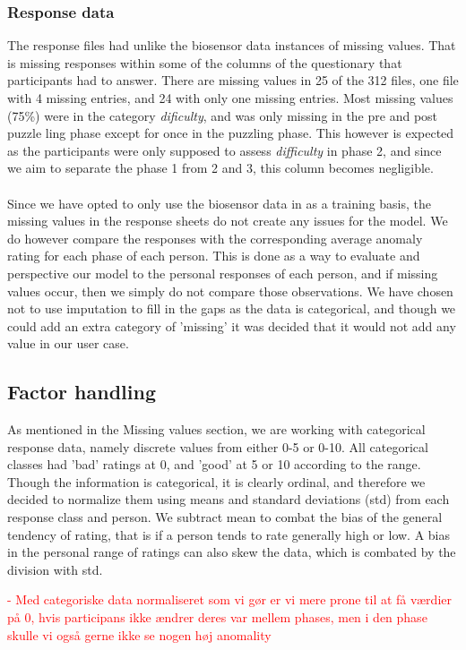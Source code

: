 \documentclass{article}
\begin{document}
\subsubsection*{Response data}
The response files had unlike the biosensor data instances of missing values. That is missing responses within some of the columns of the questionary that participants had to answer. There are missing values in 25 of the 312 files, one file with 4 missing entries, and 24 with only one missing entries. Most missing values (75\%) were in the category \textit{dificulty}, and was only missing in the pre and post puzzle ling phase except for once in the puzzling phase. This however is expected as the participants were only supposed to assess \textit{difficulty} in phase 2, and since we aim to separate the phase 1 from 2 and 3, this column becomes negligible.\\
\\
\noindent
Since we have opted to only use the biosensor data in as a training basis, the missing values in the response sheets do not create any issues for the model. We do however compare the responses with the corresponding average anomaly rating for each phase of each person. This is done as a way to evaluate and perspective our model to the personal responses of each person, and if missing values occur, then we simply do not compare those observations. We have chosen not to use imputation to fill in the gaps as the data is categorical, and though we could add an extra category of 'missing' it was decided that it would not add any value in our user case.


\subsection*{Factor handling}
As mentioned in the Missing values section, we are working with categorical response data, namely discrete values from either 0-5 or 0-10. All categorical classes had 'bad' ratings at 0, and 'good' at 5 or 10 according to the range. Though the information is categorical, it is clearly ordinal, and therefore we decided to normalize them using means and standard deviations (std) from each response class and person. We subtract mean to combat the bias of the general tendency of rating, that is if a person tends to rate generally high or low. A bias in the personal range of ratings can also skew the data, which is combated by the division with std.



\textcolor{red}{- Med categoriske data normaliseret som vi gør er vi mere prone til at få værdier på 0, hvis participans ikke ændrer deres var mellem phases, men i den phase skulle vi også gerne ikke se nogen høj anomality}
\end{document}

